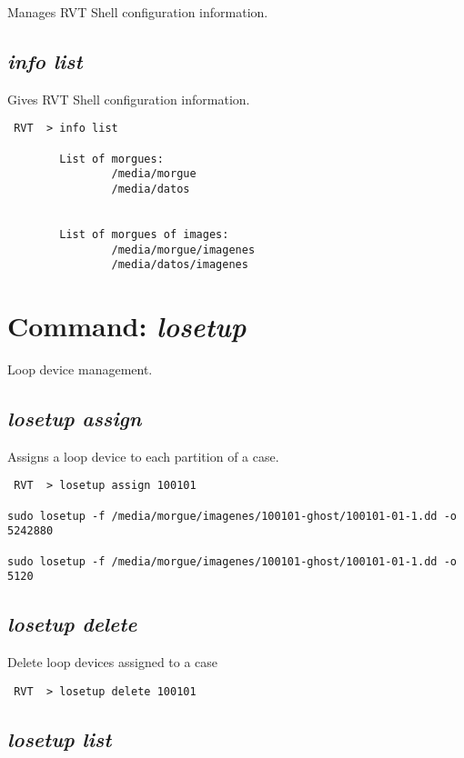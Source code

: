 \documentclass[a4paper,11pt,oneside]{report}
\begin{document}
Manages RVT Shell configuration information.

\subsection{\emph{info list}}

Gives RVT Shell configuration information.

\begin{verbatim}
 RVT  > info list

        List of morgues:
                /media/morgue 
                /media/datos 


        List of morgues of images:
                /media/morgue/imagenes 
                /media/datos/imagenes 
\end{verbatim}


\section{Command: \emph{losetup}}

Loop device management.

\subsection{\emph{losetup assign}}

Assigns a loop device to each partition of a case.

\begin{verbatim}
 RVT  > losetup assign 100101

sudo losetup -f /media/morgue/imagenes/100101-ghost/100101-01-1.dd -o 5242880

sudo losetup -f /media/morgue/imagenes/100101-ghost/100101-01-1.dd -o 5120
\end{verbatim}


\subsection{\emph{losetup delete}}

Delete loop devices assigned to a case

\begin{verbatim}
 RVT  > losetup delete 100101
\end{verbatim}


\subsection{\emph{losetup list}}
\end{document}
